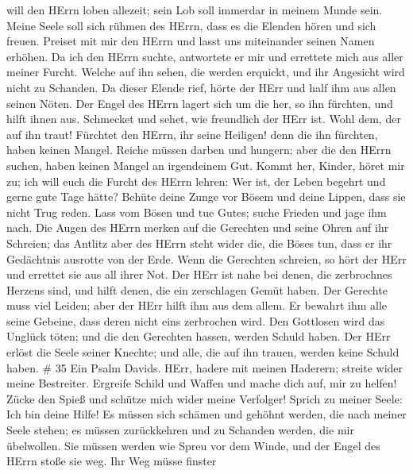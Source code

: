 will den HErrn loben allezeit; sein Lob soll immerdar in meinem Munde
sein.  Meine Seele soll sich rühmen des HErrn, dass es die
Elenden hören und sich freuen.  Preiset mit mir den HErrn
und lasst uns miteinander seinen Namen erhöhen.  Da ich den
HErrn suchte, antwortete er mir und errettete mich aus aller meiner
Furcht.  Welche auf ihn sehen, die werden erquickt, und ihr
Angesicht wird nicht zu Schanden.  Da dieser Elende rief,
hörte der HErr und half ihm aus allen seinen Nöten.  Der
Engel des HErrn lagert sich um die her, so ihn fürchten, und hilft ihnen
aus.  Schmecket und sehet, wie freundlich der HErr ist. Wohl
dem, der auf ihn traut!  Fürchtet den HErrn, ihr seine
Heiligen! denn die ihn fürchten, haben keinen Mangel. 
Reiche müssen darben und hungern; aber die den HErrn suchen, haben
keinen Mangel an irgendeinem Gut.  Kommt her, Kinder, höret
mir zu; ich will euch die Furcht des HErrn lehren:  Wer
ist, der Leben begehrt und gerne gute Tage hätte?  Behüte
deine Zunge vor Bösem und deine Lippen, dass sie nicht Trug reden.
 Lass vom Bösen und tue Gutes; suche Frieden und jage ihm
nach.  Die Augen des HErrn merken auf die Gerechten und
seine Ohren auf ihr Schreien;  das Antlitz aber des HErrn
steht wider die, die Böses tun, dass er ihr Gedächtnis ausrotte von der
Erde.  Wenn die Gerechten schreien, so hört der HErr und
errettet sie aus all ihrer Not.  Der HErr ist nahe bei
denen, die zerbrochnes Herzens sind, und hilft denen, die ein
zerschlagen Gemüt haben.  Der Gerechte muss viel Leiden;
aber der HErr hilft ihm aus dem allem.  Er bewahrt ihm alle
seine Gebeine, dass deren nicht eins zerbrochen wird.  Den
Gottlosen wird das Unglück töten; und die den Gerechten hassen, werden
Schuld haben.  Der HErr erlöst die Seele seiner Knechte;
und alle, die auf ihn trauen, werden keine Schuld haben. \# 35
 Ein Psalm Davids. HErr, hadere mit meinen Haderern; streite
wider meine Bestreiter.  Ergreife Schild und Waffen und
mache dich auf, mir zu helfen!  Zücke den Spieß und schütze
mich wider meine Verfolger! Sprich zu meiner Seele: Ich bin deine Hilfe!
 Es müssen sich schämen und gehöhnt werden, die nach meiner
Seele stehen; es müssen zurückkehren und zu Schanden werden, die mir
übelwollen.  Sie müssen werden wie Spreu vor dem Winde, und
der Engel des HErrn stoße sie weg.  Ihr Weg müsse finster
